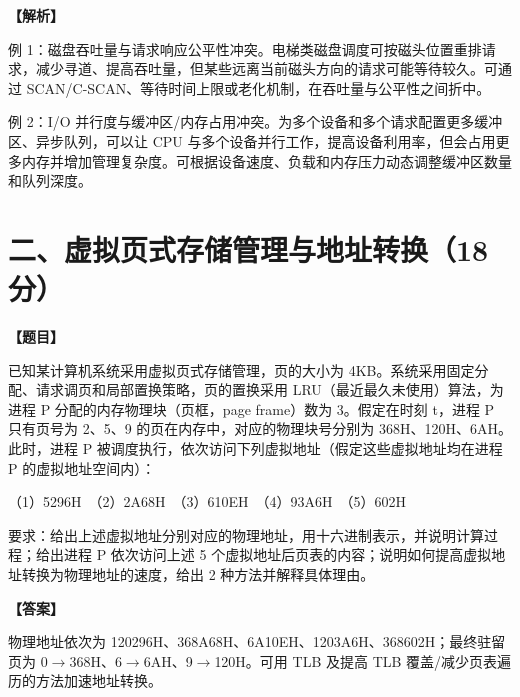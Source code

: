 \documentclass[UTF8,12pt]{ctexart}
\newenvironment{question}{\par\medskip\noindent\textbf{【题目】}\par\smallskip}{\par\medskip}
\newenvironment{explanation}{\par\noindent\textbf{【解析】}\par\smallskip}{\par\medskip}
\newenvironment{answer}{\par\noindent\textbf{【答案】}\par\smallskip}{\par}
\begin{document}
\begin{explanation}
例 1：磁盘吞吐量与请求响应公平性冲突。电梯类磁盘调度可按磁头位置重排请求，减少寻道、提高吞吐量，但某些远离当前磁头方向的请求可能等待较久。可通过 SCAN/C-SCAN、等待时间上限或老化机制，在吞吐量与公平性之间折中。

例 2：I/O 并行度与缓冲区/内存占用冲突。为多个设备和多个请求配置更多缓冲区、异步队列，可以让 CPU 与多个设备并行工作，提高设备利用率，但会占用更多内存并增加管理复杂度。可根据设备速度、负载和内存压力动态调整缓冲区数量和队列深度。
\end{explanation}
\section*{二、虚拟页式存储管理与地址转换（18 分）}
\begin{question}
已知某计算机系统采用虚拟页式存储管理，页的大小为 4KB。系统采用固定分配、请求调页和局部置换策略，页的置换采用 LRU（最近最久未使用）算法，为进程 P 分配的内存物理块（页框，page frame）数为 3。假定在时刻 t，进程 P 只有页号为 2、5、9 的页在内存中，对应的物理块号分别为 368H、120H、6AH。此时，进程 P 被调度执行，依次访问下列虚拟地址（假定这些虚拟地址均在进程 P 的虚拟地址空间内）：

（1）5296H　（2）2A68H　（3）610EH　（4）93A6H　（5）602H

要求：给出上述虚拟地址分别对应的物理地址，用十六进制表示，并说明计算过程；给出进程 P 依次访问上述 5 个虚拟地址后页表的内容；说明如何提高虚拟地址转换为物理地址的速度，给出 2 种方法并解释具体理由。
\end{question}

\begin{answer}
物理地址依次为 120296H、368A68H、6A10EH、1203A6H、368602H；最终驻留页为 0$\to$368H、6$\to$6AH、9$\to$120H。可用 TLB 及提高 TLB 覆盖/减少页表遍历的方法加速地址转换。
\end{answer}
\end{document}
